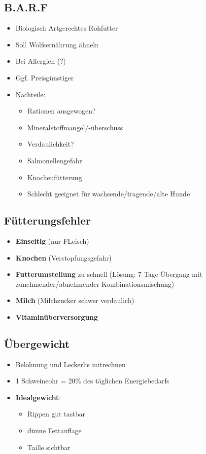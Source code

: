     \subsection{B.A.R.F}
        \begin{itemize}
            \item Biologisch Artgerechtes Rohfutter
            \item Soll Wolfsernährung ähneln
            \item Bei Allergien (?)
            \item Ggf. Preisgünstiger
            \item Nachteile:
            \begin{itemize}
                \item Rationen ausgewogen?
                \item Mineralstoffmangel/-überschuss
                \item Verdaulichkeit?
                \item Salmonellengefahr
                \item Knochenfütterung
                \item Schlecht geeignet für wachsende/tragende/alte Hunde
            \end{itemize}
        \end{itemize}

    \subsection{Fütterungsfehler}
        \begin{itemize}
            \item \textbf{Einseitig} (nur FLeisch)
            \item \textbf{Knochen} (Verstopfungsgefahr)
            \item \textbf{Futterumstellung} zu schnell (Lösung: 7 Tage Übergang mit zunehmender/abnehmender Kombinationsmischung)
            \item\textbf{Milch} (Milchzucker schwer verdaulich)
            \item \textbf{Vitaminüberversorgung}
        \end{itemize}

    \subsection{Übergewicht}
        \begin{itemize}
            \item Belohnung und Leckerlis mitrechnen
            \item 1 Schweineohr = 20\% des täglichen Energiebedarfs
            \item \textbf{Idealgewicht}:
            \begin{itemize}
                \item Rippen gut tastbar
                \item dünne Fettauflage
                \item Taille sichtbar
            \end{itemize}
        \end{itemize}